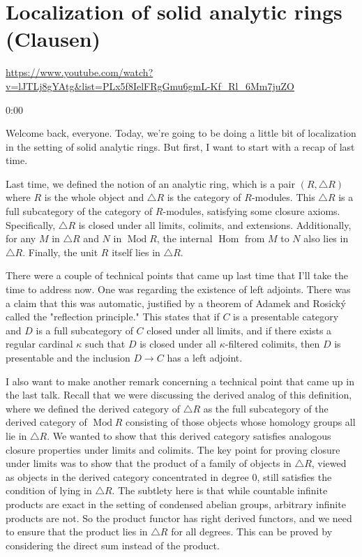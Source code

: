 
\section{\ufs Localization of solid analytic rings (Clausen)}

\url{https://www.youtube.com/watch?v=lJTLj8gYAtg&list=PLx5f8IelFRgGmu6gmL-Kf_Rl_6Mm7juZO}
\renewcommand{\yt}[2]{\href{https://www.youtube.com/watch?v=lJTLj8gYAtg&list=PLx5f8IelFRgGmu6gmL-Kf_Rl_6Mm7juZO&t=#1}{#2}}
\vspace{1em}

\begin{unfinished}{0:00}

Welcome back, everyone. Today, we're going to be doing a little bit of localization in the setting of solid analytic rings. But first, I want to start with a recap of last time.

Last time, we defined the notion of an analytic ring, which is a pair $(R, \triangle R)$ where $R$ is the whole object and $\triangle R$ is the category of $R$-modules. This $\triangle R$ is a full subcategory of the category of $R$-modules, satisfying some closure axioms. Specifically, $\triangle R$ is closed under all limits, colimits, and extensions. Additionally, for any $M$ in $\triangle R$ and $N$ in $\operatorname{Mod} R$, the internal $\operatorname{Hom}$ from $M$ to $N$ also lies in $\triangle R$. Finally, the unit $R$ itself lies in $\triangle R$.

There were a couple of technical points that came up last time that I'll take the time to address now. One was regarding the existence of left adjoints. There was a claim that this was automatic, justified by a theorem of Adamek and Rosický called the "reflection principle." This states that if $C$ is a presentable category and $D$ is a full subcategory of $C$ closed under all limits, and if there exists a regular cardinal $\kappa$ such that $D$ is closed under all $\kappa$-filtered colimits, then $D$ is presentable and the inclusion $D \to C$ has a left adjoint.

I also want to make another remark concerning a technical point that came up in the last talk. Recall that we were discussing the derived analog of this definition, where we defined the derived category of $\triangle R$ as the full subcategory of the derived category of $\operatorname{Mod} R$ consisting of those objects whose homology groups all lie in $\triangle R$. We wanted to show that this derived category satisfies analogous closure properties under limits and colimits. The key point for proving closure under limits was to show that the product of a family of objects in $\triangle R$, viewed as objects in the derived category concentrated in degree 0, still satisfies the condition of lying in $\triangle R$. The subtlety here is that while countable infinite products are exact in the setting of condensed abelian groups, arbitrary infinite products are not. So the product functor has right derived functors, and we need to ensure that the product lies in $\triangle R$ for all degrees. This can be proved by considering the direct sum instead of the product.


\end{unfinished}
